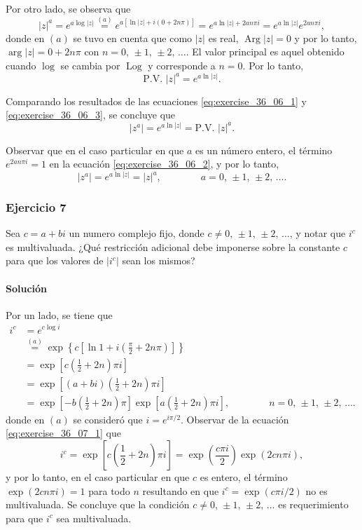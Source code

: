 \documentclass[a4paper]{report}
\DeclareMathOperator{\Arg}{Arg}
\DeclareMathOperator{\Log}{Log}
\begin{document}
Por otro lado, se observa que 
\begin{equation}\label{eq:exercise_36_06_2}
 |z|^a=e^{a\log|z|}\overset{(a)}{=}e^{a[\ln|z|+i(0+2n\pi)]}=e^{a\ln|z|+2an\pi i}=e^{a\ln|z|}e^{2an\pi i}, 
\end{equation}
donde en \((a)\) se tuvo en cuenta que como \(|z|\) es real, \(\Arg|z|=0\) y por lo tanto, \(\arg|z|=0+2n\pi\) con \(n=0,\,\pm1,\,\pm2,\,\dots\). El valor principal es aquel obtenido cuando \(\log\) se cambia por \(\Log\) y corresponde a \(n=0\). Por lo tanto, 
\begin{equation}\label{eq:exercise_36_06_3}
 \textrm{P.V. }|z|^a=e^{a\ln|z|}. 
\end{equation}

Comparando los resultados de las ecuaciones \ref{eq:exercise_36_06_1} y \ref{eq:exercise_36_06_3}, se concluye que 
\[
 |z^a|=e^{a\ln|z|}=\textrm{P.V. }|z|^a.
\]

Observar que en el caso particular en que \(a\) es un número entero, el término \(e^{2an\pi i}=1\) en la ecuación \ref{eq:exercise_36_06_2}, y por lo tanto,
\[
 |z^a|=e^{a\ln|z|}=|z|^a,
 \qquad\qquad a=0,\,\pm1,\,\pm2,\,\dots .
\]

\subsubsection{Ejercicio 7}

Sea \(c=a+bi\) un numero complejo fijo, donde \(c\neq0,\,\pm1,\,\pm2,\,\dots\), y notar que \(i^c\) es multivaluada. ¿Qué restricción adicional debe imponerse sobre la constante \(c\) para que los valores de \(|i^c|\) sean los mismos?

\paragraph{Solución} Por un lado, se tiene que 
\begin{align}
 i^c&=e^{c\log i}\nonumber\\
  &\overset{(a)}{=}\exp\left\{c\left[\ln1+i\left(\frac{\pi}{2}+2n\pi\right)\right]\right\}\nonumber\\
  &=\exp\left[c\left(\frac{1}{2}+2n\right)\pi i\right]\label{eq:exercise_36_07_1}\\
  &=\exp\left[(a+bi)\left(\frac{1}{2}+2n\right)\pi i\right]\nonumber\\
  &=\exp\left[-b\left(\frac{1}{2}+2n\right)\pi\right]\exp\left[a\left(\frac{1}{2}+2n\right)\pi i\right],\qquad\qquad n=0,\,\pm1,\,\pm2,\,\dots.\label{eq:exercise_36_07_2}
\end{align}
donde en \((a)\) se consideró que \(i=e^{i\pi/2}\). Observar de la ecuación \ref{eq:exercise_36_07_1} que 
\[
 i^c=\exp\left[c\left(\frac{1}{2}+2n\right)\pi i\right]=\exp\left(\frac{c\pi i}{2}\right)\exp\left(2cn\pi i\right),
\]
y por lo tanto, en el caso particular en que \(c\) es entero, el término \(\exp\left(2cn\pi i\right)=1\) para todo \(n\) resultando en que \(i^c=\exp(c\pi i/2)\) no es multivaluada. Se concluye que la condición \(c\neq0,\,\pm1,\,\pm2,\,\dots\) es requerimiento para que \(i^c\) sea multivaluada.
\end{document}

